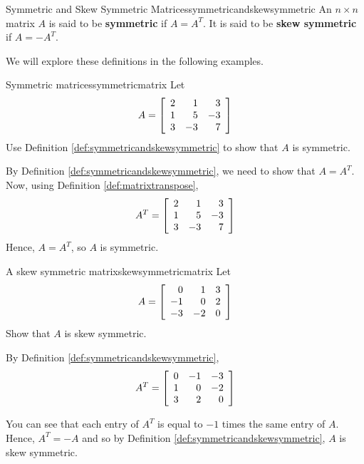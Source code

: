 \begin{definition}{Symmetric and Skew Symmetric Matrices}{symmetricandskewsymmetric}
An $n\times n$ matrix $A$ is said to be
\textbf{symmetric} if $A=A^{T}.$ It is said to be
\textbf{skew symmetric} if $A=-A^{T}.$
\end{definition}

We will explore these definitions in the following examples.

\begin{example}{Symmetric matrices}{symmetricmatrix}
Let
\begin{equation*}
A=\left[
\begin{array}{rrr}
2 & 1 & 3 \\
1 & 5 & -3 \\
3 & -3 & 7
\end{array}
\right] 
\end{equation*}
Use Definition \ref{def:symmetricandskewsymmetric} to show that $A$ is symmetric. 
\end{example}

\begin{solution}
By Definition \ref{def:symmetricandskewsymmetric}, we need to show that $A = A^T$. 
Now, using Definition \ref{def:matrixtranspose}, 
\begin{equation*}
A^{T} = \left[
\begin{array}{rrr}
2 & 1 & 3 \\
1 & 5 & -3 \\
3 & -3 & 7
\end{array}
\right]
\end{equation*}
Hence, $A = A^{T}$, so $A$ is symmetric.
\end{solution}

\begin{example}{A skew symmetric matrix}{skewsymmetricmatrix}
Let
\begin{equation*}
A=\left[
\begin{array}{rrr}
0 & 1 & 3 \\
-1 & 0 & 2 \\
-3 & -2 & 0
\end{array}
\right] 
\end{equation*}
Show that $A$ is skew symmetric.
\end{example}

\begin{solution} By Definition \ref{def:symmetricandskewsymmetric}, 
\begin{equation*}
A^{T} = \left[
\begin{array}{rrr}
0 & -1 & -3\\
1 &  0 & -2\\
3 &  2 &  0
\end{array}
\right] 
\end{equation*}

You can see that each entry of $A^T$ is equal to $-1$ times the same entry of $A$. 
Hence, $A^{T} = - A$ and so by Definition \ref{def:symmetricandskewsymmetric}, $A$ is skew symmetric. 
\end{solution}
